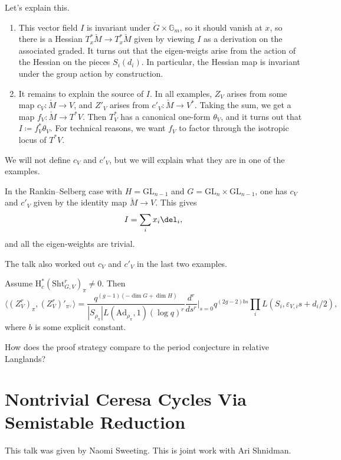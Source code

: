 \documentclass{article}
\begin{document}
Let's explain this.
\begin{enumerate}
	\item This vector field $I$ is invariant under $\check G\times\mathbb G_m$, so it should vanish at $x$, so there is a Hessian $T_x^*\check M\to T_x^*\check M$ given by viewing $I$ as a derivation on the associated graded. It turns out that the eigen-weigts arise from the action of the Hessian on the pieces $S_i(d_i)$. In particular, the Hessian map is invariant under the group action by construction.
	\item It remains to explain the source of $I$. In all examples, $Z_V$ arises from some map $c_V\colon\check M\to V$, and $Z'_V$ arises from $c'_V\colon\check M\to V^*$. Taking the sum, we get a map $f_V\colon\check M\to T^*V$. Then $T_V^*$ has a canonical one-form $\theta_V$, and it turns out that $I\coloneqq f_V^*\theta_V$. For technical reasons, we want $f_V$ to factor through the isotropic locus of $T^*V$.
\end{enumerate}
We will not define $c_V$ and $c'_V$, but we will explain what they are in one of the examples.
\begin{example}
	In the Rankin--Selberg case with $H=\mathrm{GL}_{n-1}$ and $G=\mathrm{GL}_n\times\mathrm{GL}_{n-1}$, one has $c_V$ and $c'_V$ given by the identity map $\check M\to V$. This gives
	\[I=\sum_ix_i\del_i,\]
	and all the eigen-weights are trivial.
\end{example}
The talk also worked out $c_V$ and $c'_V$ in the last two examples.
\begin{conj}
	Assume $\mathrm H^*_c(\mathrm{Sht}^r_{G,V})_\pi\ne0$. Then
	\[\langle(Z^r_V)_\pi,(Z^r_V)'_{\pi^\lor}\rangle=\frac{q^{(g-1)(-\dim G+\dim H)}}{\left|S_{\rho_\pi}\right|L(\mathrm{Ad}_{\rho_\pi},1)(\log q)^r}\frac{d^r}{ds^r}\bigg|_{s=0}q^{(2g-2)bs}\prod_iL(S_i,\varepsilon_{V,i}s+d_i/2),\]
	where $b$ is some explicit constant.
\end{conj}
\begin{idea}
	How does the proof strategy compare to the period conjecture in relative Langlands?
\end{idea}

\section{Nontrivial Ceresa Cycles Via Semistable Reduction}
This talk was given by Naomi Sweeting. This is joint work with Ari Shnidman.
\end{document}
